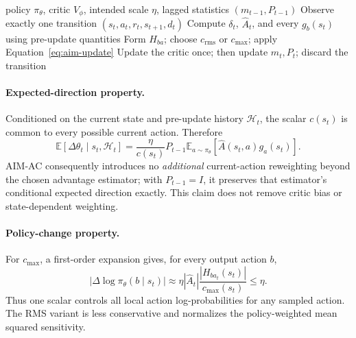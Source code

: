 \documentclass{article}
\newcommand{\E}{\mathbb{E}}
\begin{document}
\begin{algorithm}[H]
    \caption{One transition of AIM-AC (actor side; $\lambda=0$ in the core study)}
    \label{alg:aim}
    \small
    \begin{algorithmic}[1]
        \Require policy $\pi_\theta$, critic $V_\phi$, intended scale $\eta$, lagged statistics $(m_{t-1},P_{t-1})$
        \State Observe exactly one transition $(s_t,a_t,r_t,s_{t+1},d_t)$
        \State Compute $\delta_t$, $\widehat A_t$, and every $g_b(s_t)$ using pre-update quantities
        \State Form $H_{ba}$; choose $c_{\mathrm{rms}}$ or $c_{\max}$; apply Equation~\ref{eq:aim-update}
        \State Update the critic once; then update $m_t,P_t$; discard the transition
    \end{algorithmic}
\end{algorithm}

\paragraph{Expected-direction property.}
Conditioned on the current state and pre-update history $\mathcal H_t$, the scalar $c(s_t)$ is common to every possible current action. Therefore
\begin{equation}
\E[\Delta\theta_t\mid s_t,\mathcal H_t]
=\frac{\eta}{c(s_t)}P_{t-1}
\E_{a\sim\pi_\theta}[\widehat A(s_t,a)g_a(s_t)].
\label{eq:direction}
\end{equation}
AIM-AC consequently introduces no \emph{additional} current-action reweighting beyond the chosen advantage estimator; with $P_{t-1}=I$, it preserves that estimator's conditional expected direction exactly. This claim does not remove critic bias or state-dependent weighting.

\paragraph{Policy-change property.}
For $c_{\max}$, a first-order expansion gives, for every output action $b$,
\begin{equation}
\left|\Delta\log\pi_\theta(b\mid s_t)\right|
\approx \eta |\widehat A_t|
\frac{|H_{b a_t}(s_t)|}{c_{\max}(s_t)} \leq \eta.
\label{eq:bound}
\end{equation}
Thus one scalar controls all local action log-probabilities for any sampled action. The RMS variant is less conservative and normalizes the policy-weighted mean squared sensitivity.
\end{document}
